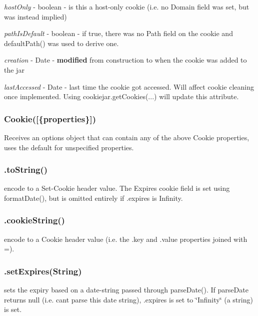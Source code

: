 \begin{DoxyItemize}
\item {\itshape host\+Only} -\/ boolean -\/ is this a host-\/only cookie (i.\+e. no Domain field was set, but was instead implied)
\item {\itshape path\+Is\+Default} -\/ boolean -\/ if true, there was no Path field on the cookie and {\ttfamily default\+Path()} was used to derive one.
\item {\itshape creation} -\/ {\ttfamily Date} -\/ {\bfseries modified} from construction to when the cookie was added to the jar
\item {\itshape last\+Accessed} -\/ {\ttfamily Date} -\/ last time the cookie got accessed. Will affect cookie cleaning once implemented. Using {\ttfamily cookiejar.\+get\+Cookies(...)} will update this attribute.
\end{DoxyItemize}

\subsubsection*{{\ttfamily Cookie(\mbox{[}\{properties\}\mbox{]})}}

Receives an options object that can contain any of the above Cookie properties, uses the default for unspecified properties.

\subsubsection*{{\ttfamily .to\+String()}}

encode to a Set-\/\+Cookie header value. The Expires cookie field is set using {\ttfamily format\+Date()}, but is omitted entirely if {\ttfamily .expires} is {\ttfamily Infinity}.

\subsubsection*{{\ttfamily .cookie\+String()}}

encode to a Cookie header value (i.\+e. the {\ttfamily .key} and {\ttfamily .value} properties joined with \textquotesingle{}=\textquotesingle{}).

\subsubsection*{{\ttfamily .set\+Expires(\+String)}}

sets the expiry based on a date-\/string passed through {\ttfamily parse\+Date()}. If parse\+Date returns {\ttfamily null} (i.\+e. can\textquotesingle{}t parse this date string), {\ttfamily .expires} is set to {\ttfamily \char`\"{}\+Infinity\char`\"{}} (a string) is set.


